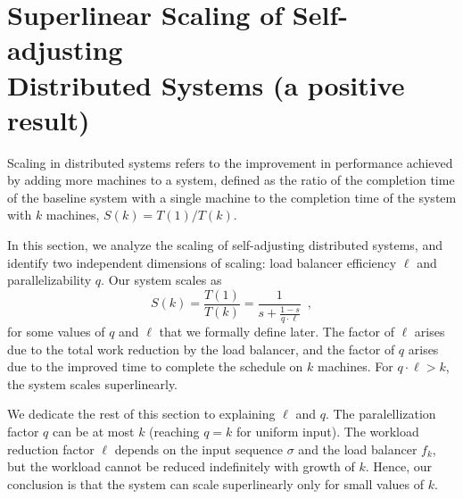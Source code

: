 \appendix













\section{Superlinear Scaling of Self-adjusting\\ Distributed Systems (a positive result)}
\label{sec:arch-scaling}


Scaling in distributed systems refers to the improvement in performance achieved by adding more machines to a system, defined as the ratio of the completion time of the baseline system with a single machine to the completion time of the system with $k$ machines, $S(k) = T(1) / T(k)$.


In this section, we analyze the scaling of self-adjusting distributed systems, and identify two independent dimensions of scaling: load balancer efficiency $\ell$ and parallelizability $q$.
Our system scales as
\begin{displaymath}
    S(k) = \frac{T(1)}{T(k)} = \frac{1}{s + \frac{1-s}{q \cdot \ell}} \enspace ,
\end{displaymath}
for some values of $q$ and $\ell$ that we formally define later.
The factor of $\ell$ arises due to the total work reduction by the load balancer, and the factor of $q$ arises due to the improved time to complete the schedule on $k$ machines.
For $q \cdot \ell > k$, the system scales superlinearly.


We dedicate the rest of this section to explaining $\ell$ and $q$.
The paralellization factor $q$ can be at most $k$ (reaching $q=k$ for uniform input). The workload reduction factor $\ell$ depends on the input sequence $\sigma$ and the load balancer $f_k$, but the workload cannot be reduced indefinitely with growth of $k$. Hence, our conclusion is that the system can scale superlinearly only for small values of $k$. 

